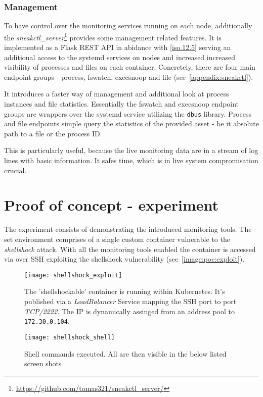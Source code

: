 \subsubsection*{Management \label{implementation:mon:hunting:mgmt}}
To have control over the monitoring services running on each node, additionally the \textit{sneakctl\_server}\footnote{\url{https://github.com/tomas321/sneakctl_server/}} provides some management related features. It is implemented as a Flask REST API in abidance with \ref{iso.12.5} serving an additional access to the systemd services on nodes and increased increased visibility of processes and files on each container. Concretely, there are four main endpoint groups - process, fswatch, execsnoop and file (see~\autoref{appendix:sneakctl}).

It introduces a faster way of management and additional look at process instances and file statistics. Essentially the fswatch and execsnoop endpoint groups are wrappers over the systemd service utilizing the \texttt{dbus} library. Process and file endpoints simple query the statistics of the provided asset - be it absolute path to a file or the process ID.

This is particularly useful, because the live monitoring data are in a stream of log lines with basic information. It safes time, which is in live system compromisation crucial.

\section{Proof of concept - experiment \label{implementation:poc}}
The experiment consists of demonstrating the introduced monitoring tools. The set environment comprises of a single custom container vulnerable to the \textit{shellshock} attack. With all the monitoring tools enabled the container is accessed via over SSH exploiting the shellshock vulnerability (see~\autoref{image:poc:exploit}).

\begin{figure}[h]
	\centering
	\texttt{[image: shellshock\_exploit]}
	\caption{The 'shellshockable' container is running within Kubernetes. It's published via a \textit{LoadBalancer} Service mapping the SSH port to port \textit{TCP/2222}. The IP is dynamically assinged from an address pool to \texttt{172.30.0.104}.}
	\label{image:poc:exploit}
\end{figure}

\begin{figure}[h]
	\centering
	\texttt{[image: shellshock\_shell]}
	\caption{Shell commands executed. All are then visible in the below listed screen shots}
	\label{image:poc:shell}
\end{figure}

